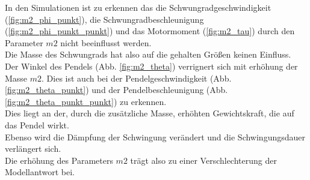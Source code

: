 In den Simulationen ist zu erkennen das die Schwungradgeschwindigkeit (\ref{fig:m2_phi_punkt}), die Schwungradbeschleunigung (\ref{fig:m2_phi_punkt_punkt}) und das Motormoment (\ref{fig:m2_tau}) durch den Parameter $m2$ nicht beeinflusst werden.\\
Die Masse des Schwungrads hat also auf die gehalten Größen keinen Einfluss.\\

Der Winkel des Pendels (Abb. \ref{fig:m2_theta}) verrignert sich mit erhöhung der Masse $m2$. 
Dies ist auch bei der Pendelgeschwindigkeit (Abb. \ref{fig:m2_theta_punkt}) und der Pendelbeschleunigung (Abb. \ref{fig:m2_theta_punkt_punkt}) zu erkennen.\\
Dies liegt an der, durch die zusätzliche Masse, erhöhten Gewichtskraft, die auf das Pendel wirkt.\\
Ebenso wird die Dämpfung der Schwingung verändert und die Schwingungsdauer verlängert sich.\\

Die erhöhung des Parameters $m2$ trägt also zu einer Verschlechterung der Modellantwort bei.\\



